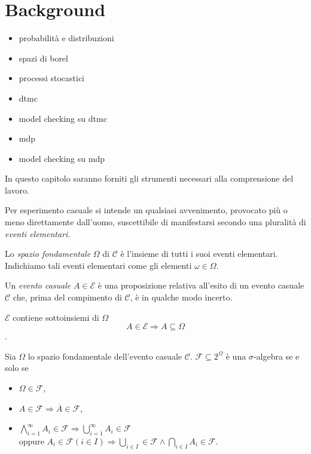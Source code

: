 \section{Background}

\begin{itemize}
	\item probabilità e distribuzioni
	\item spazi di borel
	\item processi stocastici
	\item dtmc
	\item model checking su dtmc
	\item mdp
	\item model checking su mdp
\end{itemize}

In questo capitolo saranno forniti gli strumenti necessari alla comprensione del lavoro.

\begin{mtdef}
	Per esperimento casuale si intende un qualsiasi avvenimento, provocato più o meno direttamente dall'uomo, suscettibile di manifestarsi secondo una pluralità di \emph{eventi elementari}.
\end{mtdef}

\begin{mtdef}
	Lo \emph{spazio fondamentale} $\Omega$ di $\mathcal{C}$ è l'insieme di tutti i suoi eventi elementari. Indichiamo tali eventi elementari come gli elementi $\omega \in \Omega$.
\end{mtdef}

\begin{mtdef}
	Un \emph{evento casuale} $A \in \mathcal{E}$ è una proposizione relativa all'esito di un evento casuale $\mathcal{C}$ che, prima del compimento di $\mathcal{C}$, è in qualche modo incerto.
\end{mtdef}

\begin{mtobs}
	$\mathcal{E}$ contiene sottoinsiemi di $\Omega$
	$$ A \in \mathcal{E} \Rightarrow A \subseteq \Omega $$.
\end{mtobs}


\begin{mtdef}
	Sia $\Omega$ lo spazio fondamentale dell'evento casuale $\mathcal{C}$. $\mathcal{F} \subseteq 2^\Omega$ è una $\sigma$-algebra se e solo se
	\begin{itemize}
		\item $\Omega \in \mathcal{F}$,
		\item $A \in \mathcal{F} \Rightarrow \overline{A} \in \mathcal{F}$,
		\item $\bigwedge_{i=1}^{\infty} A_i \in \mathcal{F} \Rightarrow \bigcup_{i=1}^\infty A_i \in \mathcal{F}$ \\ oppure $A_i \in \mathcal{F} (i \in I) \Rightarrow \bigcup_{i \in I} \in \mathcal{F} \wedge \bigcap_{i \in I} A_i \in \mathcal{F}$.
	\end{itemize}
\end{mtdef}

